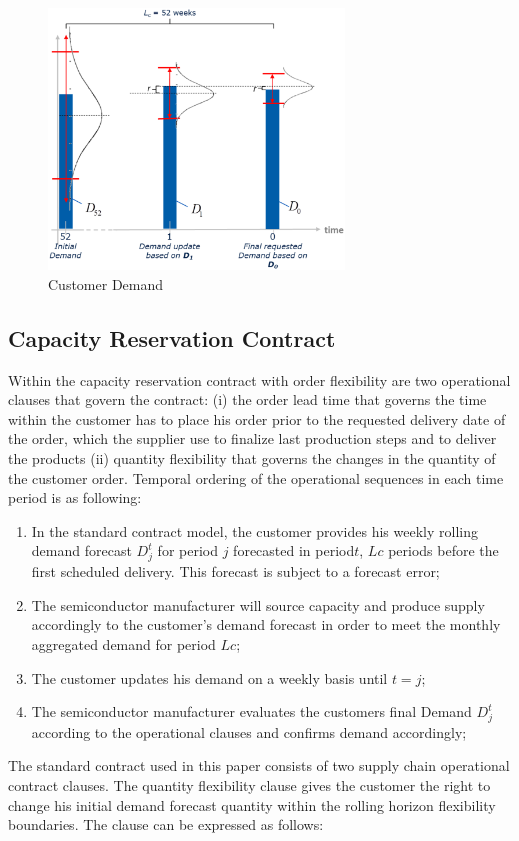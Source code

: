 \documentclass[12pt,english]{article}
\begin{document}
\begin{figure}[h!]
\begin{center}
\includegraphics[width=0.7\textwidth]{Figures/Demand_Generator.eps}
\caption{Customer Demand}%
\label{fig:Customer-Demand}
\end{center}
\end{figure}




\subsection{Capacity Reservation Contract}

Within the capacity reservation contract with order flexibility are
two operational clauses that govern the contract: (i) the order lead
time that governs the time within the customer has to place his order
prior to the requested delivery date of the order, which the supplier
use to finalize last production steps and to deliver the products
(ii) quantity flexibility that governs the changes in the quantity
of the customer order. Temporal ordering of the operational sequences
in each time period is as following:

\begin{enumerate}
\item In the standard contract model, the customer provides his weekly rolling
demand forecast $D_{j}^{t}$ for period $j$ forecasted in period$t$,
$Lc$ periods before the first scheduled delivery. This forecast is
subject to a forecast error;
\item The semiconductor manufacturer will source capacity and produce supply
accordingly to the customer\textquoteright s demand forecast in order
to meet the monthly aggregated demand for period $Lc$;
\item The customer updates his demand on a weekly basis until $t=j$;
\item The semiconductor manufacturer evaluates the customers final Demand
$D_{j}^{t}$ according to the operational clauses and confirms demand
accordingly;
\end{enumerate}
The standard contract used in this paper consists of two supply chain
operational contract clauses. The quantity flexibility clause gives
the customer the right to change his initial demand forecast quantity
within the rolling horizon flexibility boundaries. The clause can
be expressed as follows:
\end{document}
